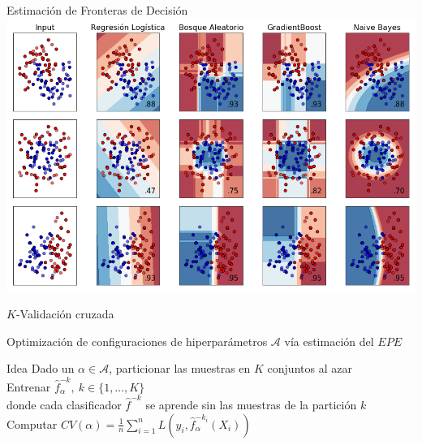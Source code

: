 \documentclass[xcolor=x11names]{beamer}
\begin{document}

\begin{frame}{Estimación de Fronteras de Decisión}
		\includegraphics[width = 0.9 \paperwidth, height = 0.7 \paperheight,
										trim = 0.2 0.2 0.2 0.2cm, left, clip = true]{slides/plot_classifier_comparison.png}
\end{frame}


\begin{frame}{$K$-Validación cruzada}

Optimización de configuraciones de hiperparámetros $\mathcal{A}$ vía estimación del $EPE$

	\begin{block}{Idea}
		Dado un $\alpha \in \mathcal{A}$, particionar las muestras en $K$ conjuntos al azar
		\\
		Entrenar $\hat{f}_{\alpha}^{-k}, \ k \in \{1, \ldots, K\}$
		\\
		donde cada clasificador $\hat{f}^{-k}$ se aprende sin las muestras de la partición $k$
		\\
		Computar $CV(\alpha) = \frac{1}{n} \sum^n_{i=1} L\left( y_i, \hat{f}_{\alpha}^{-k_i}(X_i) \right)$
	\end{block}


\end{frame}
\end{document}
